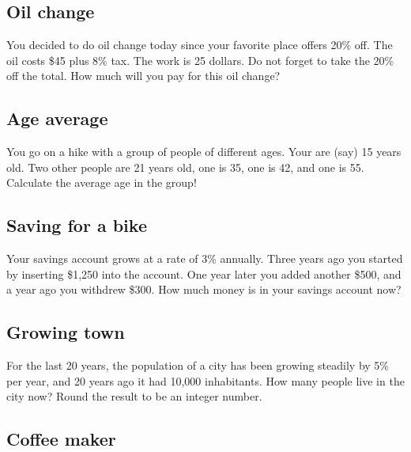 \subsection{Oil change}

You decided to do oil change today since your favorite 
place offers 20\% off. The oil costs \$45 plus 8\% tax. 
The work is 25 dollars. Do not forget to take the 20\% off the 
total. How much will you pay for this oil change? 


\subsection{Age average}

You go on a hike with a group of people of different 
ages. Your are (say) 15 years old. Two other people 
are 21 years old, one is 35, one is 42, and one is 55.
Calculate the average age in the group!


\subsection{Saving for a bike}

Your savings account grows at a rate of 3\% annually. Three years ago you 
started by inserting \$1,250 into the account. One year later 
you added another \$500, and a year ago you withdrew \$300. 
How much money is in your savings account now?


\subsection{Growing town}

For the last 20 years, the population of a city has been growing 
steadily by 5\% per year, and 20 years ago it had 10,000 inhabitants.
How many people live in the city now? Round the result to be an 
integer number.


\subsection{Coffee maker}


